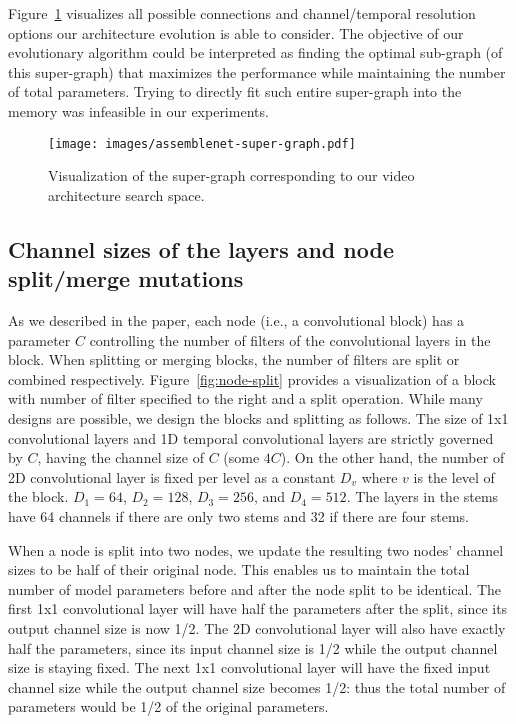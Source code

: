 \documentclass{article} \usepackage{iclr2020_conference,times}
\begin{document}
Figure~\ref{fig:super-graph} visualizes all possible connections and channel/temporal resolution options our architecture evolution is able to consider. The objective of our evolutionary algorithm could be interpreted as finding the optimal sub-graph (of this super-graph) that maximizes the performance while maintaining the number of total parameters. Trying to directly fit such entire super-graph into the memory was infeasible in our experiments.

\begin{figure}[h]
  \centering
   \texttt{[image: images/assemblenet-super-graph.pdf]}
  \caption{Visualization of the super-graph corresponding to our video architecture search space.}
  \label{fig:super-graph}
\end{figure}

\subsection{Channel sizes of the layers and node split/merge mutations}

As we described in the paper, each node (i.e., a convolutional block) has a parameter $C$ controlling the number of filters of the convolutional layers in the block. When splitting or merging blocks, the number of filters are split or combined respectively. Figure~\ref{fig:node-split} provides a visualization of a block with number of filter specified to the right and a split operation. While many designs are possible, we design the blocks and splitting as follows. The size of 1x1 convolutional layers and 1D temporal convolutional layers are strictly governed by $C$, having the channel size of $C$ (some $4C$). On the other hand, the number of 2D convolutional layer is fixed per level as a constant $D_v$ where $v$ is the level of the block. $D_1 = 64$, $D_2 = 128$, $D_3 = 256$, and $D_4 = 512$. The layers in the stems have 64 channels if there are only two stems and 32 if there are four stems.

When a node is split into two nodes, we update the resulting two nodes' channel sizes to be half of their original node. This enables us to maintain the total number of model parameters before and after the node split to be identical. The first 1x1 convolutional layer will have half the parameters after the split, since its output channel size is now 1/2. The 2D convolutional layer will also have exactly half the parameters, since its input channel size is 1/2 while the output channel size is staying fixed. The next 1x1 convolutional layer will have the fixed input channel size while the output channel size becomes 1/2: thus the total number of parameters would be 1/2 of the original parameters. 
\end{document}
